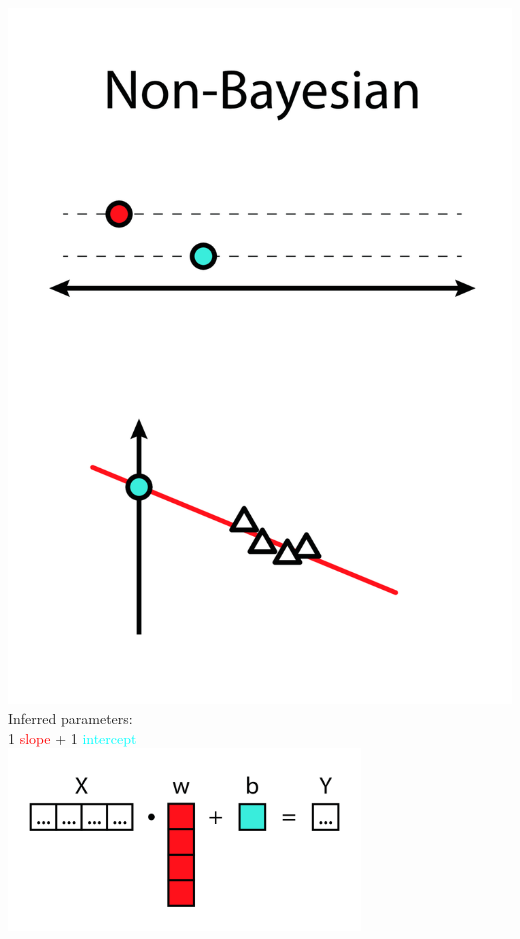 \documentclass[10pt,xcolor=x11names,compress, show notes]{beamer}%
\begin{document}
\begin{frame}{\insertsectionhead}
\vspace{-0.5cm}
\begin{minipage}{0.47\textwidth}
	\centering
	\includegraphics[height=0.7\textwidth]{linreg1.png}\\
\vfill
	Inferred parameters:\\ 1 \textcolor{red}{slope} + 1 \textcolor{cyan}{intercept}\\
	\includegraphics[width=0.7\textwidth]{intro1.png}\\
	

\end{minipage}
\end{frame}
\end{document}
